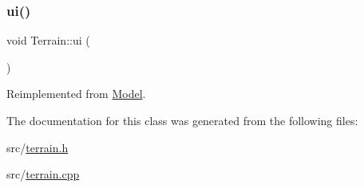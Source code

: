 \subsubsection{\texorpdfstring{ui()}{ui()}}
{\footnotesize\ttfamily void Terrain\+::ui (\begin{DoxyParamCaption}{ }\end{DoxyParamCaption})\hspace{0.3cm}{\ttfamily [virtual]}}



Reimplemented from \hyperlink{classModel_a6c1d9003a9cb7699ba70b250c69d8ba4}{Model}.



The documentation for this class was generated from the following files\+:\begin{DoxyCompactItemize}
\item 
src/\hyperlink{terrain_8h}{terrain.\+h}\item 
src/\hyperlink{terrain_8cpp}{terrain.\+cpp}\end{DoxyCompactItemize}

